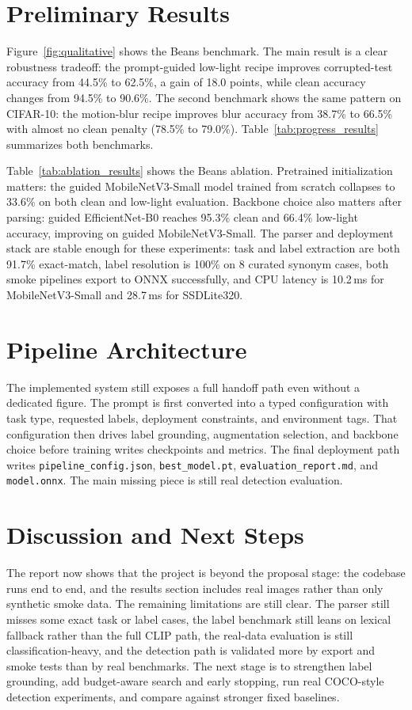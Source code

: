 \documentclass[10pt,twocolumn,letterpaper]{article}
\begin{document}
\section{Preliminary Results}
Figure~\ref{fig:qualitative} shows the Beans benchmark. The main result is a clear robustness tradeoff: the prompt-guided low-light recipe improves corrupted-test accuracy from 44.5\% to 62.5\%, a gain of 18.0 points, while clean accuracy changes from 94.5\% to 90.6\%. The second benchmark shows the same pattern on CIFAR-10: the motion-blur recipe improves blur accuracy from 38.7\% to 66.5\% with almost no clean penalty (78.5\% to 79.0\%). Table~\ref{tab:progress_results} summarizes both benchmarks.

Table~\ref{tab:ablation_results} shows the Beans ablation. Pretrained initialization matters: the guided MobileNetV3-Small model trained from scratch collapses to 33.6\% on both clean and low-light evaluation. Backbone choice also matters after parsing: guided EfficientNet-B0 reaches 95.3\% clean and 66.4\% low-light accuracy, improving on guided MobileNetV3-Small. The parser and deployment stack are stable enough for these experiments: task and label extraction are both 91.7\% exact-match, label resolution is 100\% on 8 curated synonym cases, both smoke pipelines export to ONNX successfully, and CPU latency is 10.2\,ms for MobileNetV3-Small and 28.7\,ms for SSDLite320.

\section{Pipeline Architecture}
The implemented system still exposes a full handoff path even without a dedicated figure. The prompt is first converted into a typed configuration with task type, requested labels, deployment constraints, and environment tags. That configuration then drives label grounding, augmentation selection, and backbone choice before training writes checkpoints and metrics. The final deployment path writes \texttt{pipeline\_config.json}, \texttt{best\_model.pt}, \texttt{evaluation\_report.md}, and \texttt{model.onnx}. The main missing piece is still real detection evaluation.
\afterpage{%


}

\section{Discussion and Next Steps}
The report now shows that the project is beyond the proposal stage: the codebase runs end to end, and the results section includes real images rather than only synthetic smoke data. The remaining limitations are still clear. The parser still misses some exact task or label cases, the label benchmark still leans on lexical fallback rather than the full CLIP path, the real-data evaluation is still classification-heavy, and the detection path is validated more by export and smoke tests than by real benchmarks. The next stage is to strengthen label grounding, add budget-aware search and early stopping, run real COCO-style detection experiments, and compare against stronger fixed baselines.

{\tiny
\setlength{\bibsep}{0pt}


}
\end{document}
